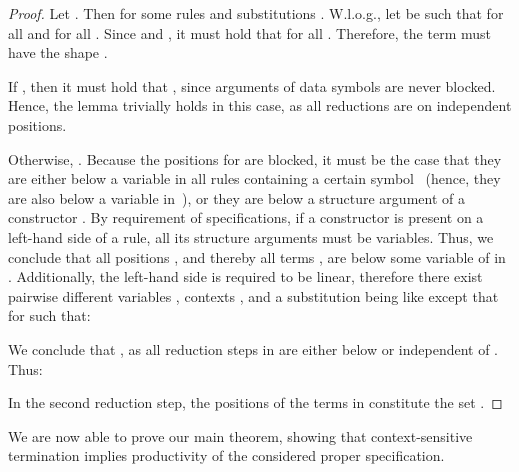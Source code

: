\documentclass{eptcs}
\begin{document}
\begin{proof}
Let .
Then  for some rules
 and
substitutions .
W.l.o.g., let  be such that
 for all 
and  for all .
Since  and , it must
hold that  for all .
Therefore, the term  must have the shape
.

If , then it must hold that , since arguments of data
symbols are never blocked. Hence, the lemma trivially holds in this case, as all
reductions are on independent positions.

Otherwise, .
Because the positions  for  are blocked, it must be the case
that they are either below a variable in all rules containing a certain
symbol~ (hence, they are also below a variable in~), or they are
below a structure argument of a constructor . By requirement of
specifications, if a constructor is present on a left-hand side of a rule, all
its structure arguments must be variables. Thus, we conclude that all positions
, and thereby all terms , are below some variable of
 in . Additionally, the left-hand side  is required to be
linear, therefore there exist pairwise different variables ,
contexts , and a substitution  being like 
except that  for  such that:


We conclude that , as all reduction steps in
 are either below or independent of . Thus:


In the second reduction step, the positions of the terms 
in  constitute the set .
\end{proof}

We are now able to prove our main theorem, showing that context-sensitive
termination implies productivity of the considered proper specification.
\end{document}
